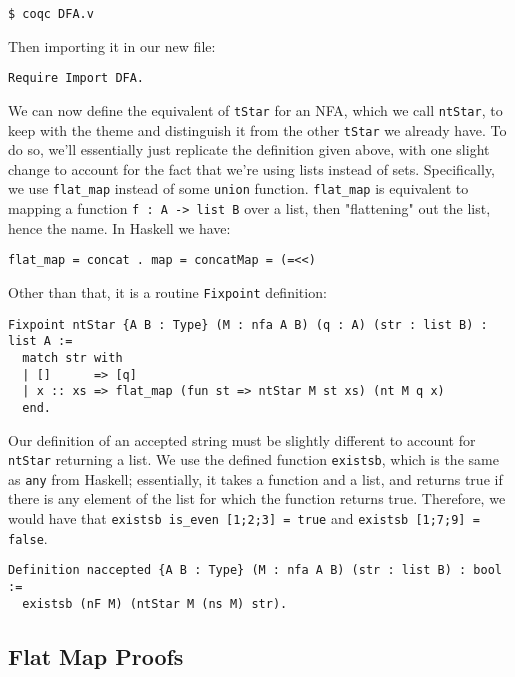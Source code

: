 \begin{verbatim}
$ coqc DFA.v
\end{verbatim}

Then importing it in our new file:

\begin{verbatim}
Require Import DFA.
\end{verbatim}

We can now define the equivalent of \texttt{tStar} for an NFA, which we call \texttt{ntStar}, to keep with the theme and distinguish it from the other \texttt{tStar} we already have.
To do so, we'll essentially just replicate the definition given above, with one slight change to account for the fact that we're using lists instead of sets.
Specifically, we use \texttt{flat_map} instead of some \texttt{union} function.
\texttt{flat_map} is equivalent to mapping a function \texttt{f : A -> list B} over a list, then "flattening" out the list, hence the name.
In Haskell we have:

\begin{verbatim}
flat_map = concat . map = concatMap = (=<<)
\end{verbatim}

Other than that, it is a routine \texttt{Fixpoint} definition:

\begin{verbatim}
Fixpoint ntStar {A B : Type} (M : nfa A B) (q : A) (str : list B) : list A :=
  match str with
  | []      => [q]
  | x :: xs => flat_map (fun st => ntStar M st xs) (nt M q x)
  end.
\end{verbatim}

Our definition of an accepted string must be slightly different to account for \texttt{ntStar} returning a list.
We use the defined function \texttt{existsb}, which is the same as \texttt{any} from Haskell; essentially, it takes a function and a list, and returns true if there is any element of the list for which the function returns true.
Therefore, we would have that \texttt{existsb is_even [1;2;3] = true} and \texttt{existsb [1;7;9] = false}.

\begin{verbatim}
Definition naccepted {A B : Type} (M : nfa A B) (str : list B) : bool :=
  existsb (nF M) (ntStar M (ns M) str).
\end{verbatim}

\subsection{Flat Map Proofs}

